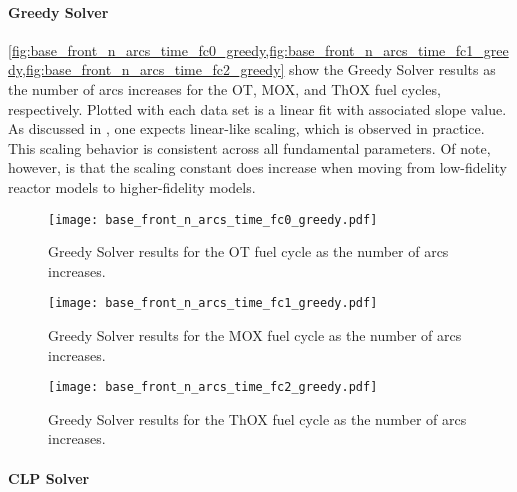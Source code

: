 \paragraph{Greedy Solver}

\cref{fig:base_front_n_arcs_time_fc0_greedy,fig:base_front_n_arcs_time_fc1_greedy,fig:base_front_n_arcs_time_fc2_greedy}
show the Greedy Solver results as the number of arcs increases for the OT, MOX,
and ThOX fuel cycles, respectively. Plotted with each data set is a linear fit
with associated slope value. As discussed in , one expects
linear-like scaling, which is observed in practice. This scaling behavior is
consistent across all fundamental parameters. Of note, however, is that the
scaling constant does increase when moving from low-fidelity reactor models to
higher-fidelity models.

\begin{figure}[h!]
  \begin{center}
    \texttt{[image: base\_front\_n\_arcs\_time\_fc0\_greedy.pdf]}
    \caption{
      \label{fig:base_front_n_arcs_time_fc0_greedy}
      Greedy Solver results for the OT fuel cycle as the number of arcs
      increases.  }
  \end{center}
\end{figure}

\begin{figure}[h!]
  \begin{center}
    \texttt{[image: base\_front\_n\_arcs\_time\_fc1\_greedy.pdf]}
    \caption{
      \label{fig:base_front_n_arcs_time_fc1_greedy}
      Greedy Solver results for the MOX fuel cycle as the number of arcs
      increases.
    }
  \end{center}
\end{figure}

\begin{figure}[h!]
  \begin{center}
    \texttt{[image: base\_front\_n\_arcs\_time\_fc2\_greedy.pdf]}
    \caption{
      \label{fig:base_front_n_arcs_time_fc2_greedy}
      Greedy Solver results for the ThOX fuel cycle as the number of arcs
      increases.
      }
  \end{center}
\end{figure}

\paragraph{CLP Solver}

